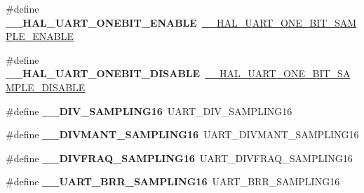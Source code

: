 \begin{DoxyCompactItemize}
\#define {\bfseries \+\_\+\+\_\+\+H\+A\+L\+\_\+\+U\+A\+R\+T\+\_\+\+O\+N\+E\+B\+I\+T\+\_\+\+E\+N\+A\+B\+LE}~\mbox{\hyperlink{group___u_a_r_t___exported___macros_ga3524747e5896296ab066d786431503ce}{\+\_\+\+\_\+\+H\+A\+L\+\_\+\+U\+A\+R\+T\+\_\+\+O\+N\+E\+\_\+\+B\+I\+T\+\_\+\+S\+A\+M\+P\+L\+E\+\_\+\+E\+N\+A\+B\+LE}}
\item 
\mbox{\label{group___h_a_l___u_a_r_t___aliased___defines_ga93fcc521745111012558544b198be1ce}} 
\#define {\bfseries \+\_\+\+\_\+\+H\+A\+L\+\_\+\+U\+A\+R\+T\+\_\+\+O\+N\+E\+B\+I\+T\+\_\+\+D\+I\+S\+A\+B\+LE}~\mbox{\hyperlink{group___u_a_r_t___exported___macros_ga2dbd7e6592e8c5999f817b69f0fd24bb}{\+\_\+\+\_\+\+H\+A\+L\+\_\+\+U\+A\+R\+T\+\_\+\+O\+N\+E\+\_\+\+B\+I\+T\+\_\+\+S\+A\+M\+P\+L\+E\+\_\+\+D\+I\+S\+A\+B\+LE}}
\item 
\mbox{\label{group___h_a_l___u_a_r_t___aliased___defines_ga95b08a06aee2ed42542ac95224cf13a8}} 
\#define {\bfseries \+\_\+\+\_\+\+D\+I\+V\+\_\+\+S\+A\+M\+P\+L\+I\+N\+G16}~U\+A\+R\+T\+\_\+\+D\+I\+V\+\_\+\+S\+A\+M\+P\+L\+I\+N\+G16
\item 
\mbox{\label{group___h_a_l___u_a_r_t___aliased___defines_gaae0a8a1c78ef85c5d4e980f123dce2cb}} 
\#define {\bfseries \+\_\+\+\_\+\+D\+I\+V\+M\+A\+N\+T\+\_\+\+S\+A\+M\+P\+L\+I\+N\+G16}~U\+A\+R\+T\+\_\+\+D\+I\+V\+M\+A\+N\+T\+\_\+\+S\+A\+M\+P\+L\+I\+N\+G16
\item 
\mbox{\label{group___h_a_l___u_a_r_t___aliased___defines_ga165ca293ce5aa1dc825ce6e69f104f99}} 
\#define {\bfseries \+\_\+\+\_\+\+D\+I\+V\+F\+R\+A\+Q\+\_\+\+S\+A\+M\+P\+L\+I\+N\+G16}~U\+A\+R\+T\+\_\+\+D\+I\+V\+F\+R\+A\+Q\+\_\+\+S\+A\+M\+P\+L\+I\+N\+G16
\item 
\mbox{\label{group___h_a_l___u_a_r_t___aliased___defines_ga4ef81a279eab794f777deede4ef777cd}} 
\#define {\bfseries \+\_\+\+\_\+\+U\+A\+R\+T\+\_\+\+B\+R\+R\+\_\+\+S\+A\+M\+P\+L\+I\+N\+G16}~U\+A\+R\+T\+\_\+\+B\+R\+R\+\_\+\+S\+A\+M\+P\+L\+I\+N\+G16
\item 
\mbox{\label{group___h_a_l___u_a_r_t___aliased___defines_ga5cba2faadc25e5ece57cd3322adf4151}} 

\end{DoxyCompactItemize}
